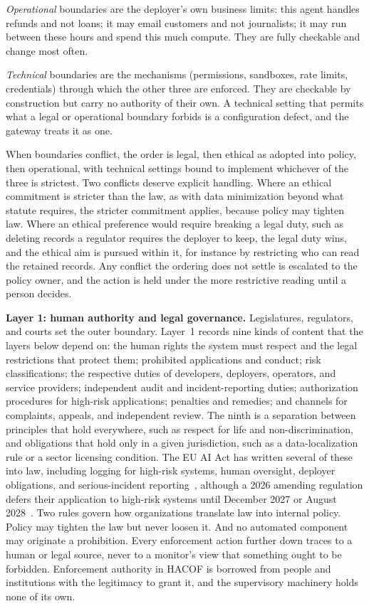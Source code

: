 \documentclass[journal]{IEEEtran}
\newcommand{\hacof}{HACOF}
\begin{document}
\textit{Operational} boundaries are the deployer's own business limits: this agent handles refunds and not loans; it may email customers and not journalists; it may run between these hours and spend this much compute. They are fully checkable and change most often.

\textit{Technical} boundaries are the mechanisms (permissions, sandboxes, rate limits, credentials) through which the other three are enforced. They are checkable by construction but carry no authority of their own. A technical setting that permits what a legal or operational boundary forbids is a configuration defect, and the gateway treats it as one.

When boundaries conflict, the order is legal, then ethical as adopted into policy, then operational, with technical settings bound to implement whichever of the three is strictest. Two conflicts deserve explicit handling. Where an ethical commitment is stricter than the law, as with data minimization beyond what statute requires, the stricter commitment applies, because policy may tighten law. Where an ethical preference would require breaking a legal duty, such as deleting records a regulator requires the deployer to keep, the legal duty wins, and the ethical aim is pursued within it, for instance by restricting who can read the retained records. Any conflict the ordering does not settle is escalated to the policy owner, and the action is held under the more restrictive reading until a person decides.

\textbf{Layer 1: human authority and legal governance.} Legislatures, regulators, and courts set the outer boundary. Layer~1 records nine kinds of content that the layers below depend on: the human rights the system must respect and the legal restrictions that protect them; prohibited applications and conduct; risk classifications; the respective duties of developers, deployers, operators, and service providers; independent audit and incident-reporting duties; authorization procedures for high-risk applications; penalties and remedies; and channels for complaints, appeals, and independent review. The ninth is a separation between principles that hold everywhere, such as respect for life and non-discrimination, and obligations that hold only in a given jurisdiction, such as a data-localization rule or a sector licensing condition. The EU AI Act has written several of these into law, including logging for high-risk systems, human oversight, deployer obligations, and serious-incident reporting~\cite{euaiact2024},
although a 2026 amending regulation defers their application to high-risk systems until December 2027 or August 2028~\cite{euaiomnibus2026}.
Two rules govern how organizations translate law into internal policy. Policy may tighten the law but never loosen it. And no automated component may originate a prohibition. Every enforcement action further down traces to a human or legal source, never to a monitor's view that something ought to be forbidden. Enforcement authority in \hacof{} is borrowed from people and institutions with the legitimacy to grant it, and the supervisory machinery holds none of its own.
\end{document}
